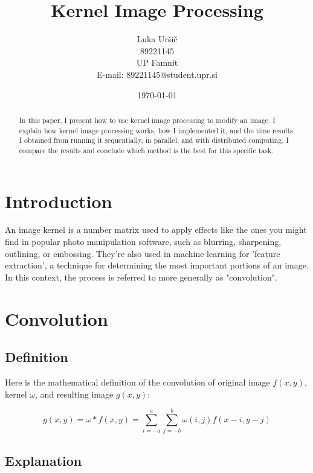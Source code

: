 \documentclass{article}
\title{Kernel Image Processing}
\author{Luka Uršič \\ 89221145 \\ UP Famnit \\ E-mail: 89221145@student.upr.si}
\date{\today}
\begin{document}
\maketitle
\thispagestyle{empty}

\begin{abstract}
    In this paper, I present how to use kernel image processing to modify an image. I explain how kernel image processing works, how I implemented it, and the time results I obtained from running it sequentially, in parallel, and with distributed computing. I compare the results and conclude which method is the best for this specific task.
\end{abstract}

\begin{multicols}{2}

    \section{Introduction}
    An image kernel is a number matrix used to apply effects like the ones you might find in popular photo manipulation software, such as blurring, sharpening, outlining, or embossing. They're also used in machine learning for 'feature extraction', a technique for determining the most important portions of an image. In this context, the process is referred to more generally as "convolution".
    \cite{setosa}

    \section{Convolution}

    \subsection{Definition}

    Here is the mathematical definition of the convolution of original image $f(x, y)$, kernel $\omega$, and resulting image $g(x, y)$:

    \begin{equation}
        g(x, y) = \omega * f(x, y) = \sum_{i=-a}^{a} \sum_{j=-b}^{b} \omega(i, j) f(x-i, y-j)
    \end{equation}
    \cite{wikipedia}

    \subsection{Explanation}


\end{multicols}
\end{document}
